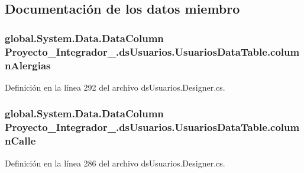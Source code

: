 \subsection{Documentación de los datos miembro}
\hypertarget{class_proyecto___integrador__3_1_1ds_usuarios_1_1_usuarios_data_table_afd6b2ab9618c5bcfa6d2837c4709b6fa}{
\subsubsection[{column\-Alergias}]{\setlength{\rightskip}{0pt plus 5cm}global.\-System.\-Data.\-Data\-Column Proyecto\-\_\-\-Integrador\-\_.\-ds\-Usuarios.\-Usuarios\-Data\-Table.\-column\-Alergias\hspace{0.3cm}{\ttfamily [private]}}}\label{class_proyecto___integrador__3_1_1ds_usuarios_1_1_usuarios_data_table_afd6b2ab9618c5bcfa6d2837c4709b6fa}


Definición en la línea 292 del archivo ds\-Usuarios.\-Designer.\-cs.

\hypertarget{class_proyecto___integrador__3_1_1ds_usuarios_1_1_usuarios_data_table_a84de0144da103ba5bc2a1c48e824d49d}{
\subsubsection[{column\-Calle}]{\setlength{\rightskip}{0pt plus 5cm}global.\-System.\-Data.\-Data\-Column Proyecto\-\_\-\-Integrador\-\_.\-ds\-Usuarios.\-Usuarios\-Data\-Table.\-column\-Calle\hspace{0.3cm}{\ttfamily [private]}}}\label{class_proyecto___integrador__3_1_1ds_usuarios_1_1_usuarios_data_table_a84de0144da103ba5bc2a1c48e824d49d}


Definición en la línea 286 del archivo ds\-Usuarios.\-Designer.\-cs.

